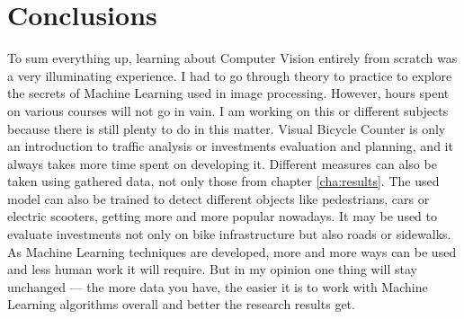\chapter{Conclusions}
\label{cha:conclusions}
To sum everything up, learning about Computer Vision entirely from scratch was a very illuminating experience. I had to go through theory to practice to explore the secrets of Machine Learning used in image processing. However, hours spent on various courses will not go in vain. I am working on this or different subjects because there is still plenty to do in this matter. Visual Bicycle Counter is only an introduction to traffic analysis or investments evaluation and planning, and it always takes more time spent on developing it. Different measures can also be taken using gathered data, not only those from chapter \ref{cha:results}. The used model can also be trained to detect different objects like pedestrians, cars or electric scooters, getting more and more popular nowadays. It may be used to evaluate investments not only on bike infrastructure but also roads or sidewalks. As Machine Learning techniques are developed, more and more ways can be used and less human work it will require. But in my opinion one thing will stay unchanged --- the more data you have, the easier it is to work with Machine Learning algorithms overall and better the research results get.